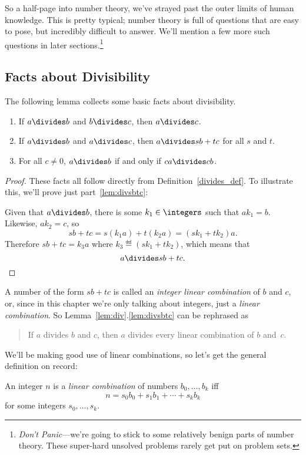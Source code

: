 So a half-page into number theory, we've strayed past the outer limits
of human knowledge.  This is pretty typical; number theory is full of
questions that are easy to pose, but incredibly difficult to answer.
We'll mention a few more such questions in later
sections.\footnote{\emph{Don't Panic}---we're going to stick to some
  relatively benign parts of number theory.  These super-hard unsolved
  problems rarely get put on problem sets.}

\subsection{Facts about Divisibility}

The following lemma collects some basic facts about divisibility.

\begin{lemma}\label{lem:div}\mbox{}
\begin{enumerate}

\item\label{lem:divtrans} If $a \divides b$ and $b \divides c$, then $a \divides c$.

\item\label{lem:divsbtc} If $a \divides b$ and $a \divides c$, then $a \divides sb + tc$
  for all $s$ and $t$.

\item\label{lem:divcancel} For all $c \neq 0$, $a \divides b$ if and only if $ca \divides
  cb$.
\end{enumerate}
\end{lemma}

\begin{proof}
These facts all follow directly from Definition~\ref{divides_def}.  To
illustrate this, we'll prove just part~\ref{lem:divsbtc}:

Given that $a \divides b$, there is some $k_1 \in \integers$ such that $a k_1 = b$.
Likewise, $a k_2 = c$, so
\[
sb+tc= s(k_1a) + t(k_2a) = (sk_1+tk_2)a.
\]
Therefore $sb+tc = k_3a$ where $k_3 \eqdef (sk_1+tk_2)$, which means that
\[
a \divides sb+tc.
\]
\end{proof}

A number of the form $sb+tc$ is called an \emph{integer linear
  combination}%
of $b$ and $c$, or, since in this chapter we're only
talking about integers, just a \emph{linear combination}.  So
Lemma~\ref{lem:div}.\ref{lem:divsbtc} can be rephrased as
\begin{quote}
If $a$ divides $b$ and $c$, then $a$ divides every linear combination
of $b$ and~$c$.
\end{quote}
We'll be making good use of linear combinations, so let's get the
general definition on record:
\begin{definition}\label{linear_def}
An integer $n$ is a \emph{linear combination} of numbers $b_0,\dots,b_k$ iff
\[
n = s_0b_0+s_1b_1+\cdots+s_kb_k
\]
for some integers $s_0,\dots,s_k$.
\end{definition}

